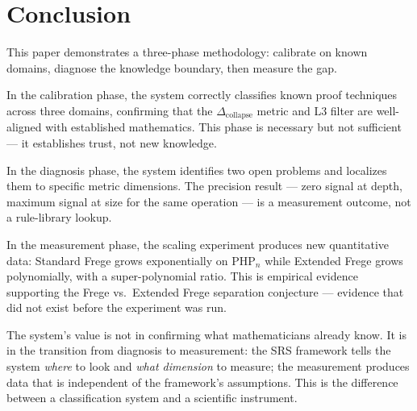 \documentclass[11pt,a4paper]{article}
\newcommand{\Dcollapse}{\Delta_{\mathrm{collapse}}}
\newcommand{\PHP}{\mathrm{PHP}}
\begin{document}
\section{Conclusion}
\label{sec:conclusion}

This paper demonstrates a three-phase methodology: calibrate on known domains, diagnose the knowledge boundary, then measure the gap.

In the calibration phase, the system correctly classifies known proof techniques across three domains, confirming that the $\Dcollapse$ metric and L3 filter are well-aligned with established mathematics. This phase is necessary but not sufficient --- it establishes trust, not new knowledge.

In the diagnosis phase, the system identifies two open problems and localizes them to specific metric dimensions. The precision result --- zero signal at depth, maximum signal at size for the same operation --- is a measurement outcome, not a rule-library lookup.

In the measurement phase, the scaling experiment produces new quantitative data: Standard Frege grows exponentially on $\PHP_n$ while Extended Frege grows polynomially, with a super-polynomial ratio. This is empirical evidence supporting the Frege vs.\ Extended Frege separation conjecture --- evidence that did not exist before the experiment was run.

The system's value is not in confirming what mathematicians already know. It is in the transition from diagnosis to measurement: the SRS framework tells the system \emph{where} to look and \emph{what dimension} to measure; the measurement produces data that is independent of the framework's assumptions. This is the difference between a classification system and a scientific instrument.
\end{document}

